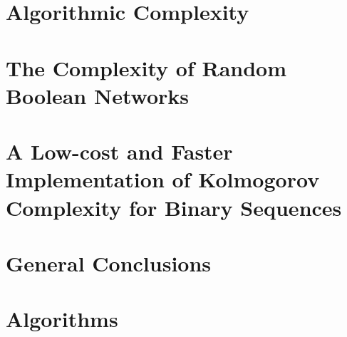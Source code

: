 \documentclass[12pt,twoside]{report}
\begin{document}
\chapter{Algorithmic Complexity}



\chapter{The Complexity of Random Boolean Networks}


\newpage\null\thispagestyle{blank}\newpage

\chapter{A Low-cost and Faster Implementation of Kolmogorov Complexity for Binary Sequences}



\chapter{General Conclusions}


\appendix
\chapter{Algorithms}


\cleardoublepage
{}
\printbibliography[title={References}]

\clearpage
\thispagestyle{empty}
\phantom{a}
\vfill
\newpage
\vfill
\end{document}

